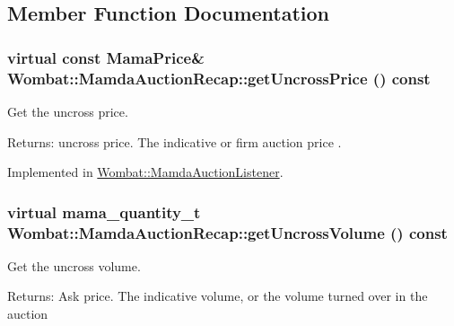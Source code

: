 \subsection{Member Function Documentation}
\hypertarget{classWombat_1_1MamdaAuctionRecap_6a54a4b7e3c25078a631192d8af96b1f}{
\subsubsection[getUncrossPrice]{\setlength{\rightskip}{0pt plus 5cm}virtual const Mama\-Price\& Wombat::Mamda\-Auction\-Recap::get\-Uncross\-Price () const}}
\label{classWombat_1_1MamdaAuctionRecap_6a54a4b7e3c25078a631192d8af96b1f}


Get the uncross price. 

\begin{Desc}
\item[Returns:]uncross price. The indicative or firm auction price . \end{Desc}


Implemented in \hyperlink{classWombat_1_1MamdaAuctionListener_d048e1fc8517df34c118245b89069da0}{Wombat::Mamda\-Auction\-Listener}.\hypertarget{classWombat_1_1MamdaAuctionRecap_d6d2a20927c91f960d10d2820c154998}{
\subsubsection[getUncrossVolume]{\setlength{\rightskip}{0pt plus 5cm}virtual mama\_\-quantity\_\-t Wombat::Mamda\-Auction\-Recap::get\-Uncross\-Volume () const}}
\label{classWombat_1_1MamdaAuctionRecap_d6d2a20927c91f960d10d2820c154998}


Get the uncross volume. 

\begin{Desc}
\item[Returns:]Ask price. The indicative volume, or the volume turned over in the auction \end{Desc}


